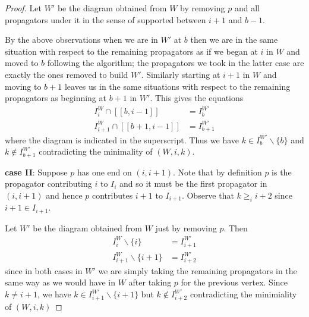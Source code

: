 \documentclass[11pt]{article}
\newcommand{\interval}[2]{[\![#1,#2]\!]}
\theoremstyle{remark}
\theoremstyle{definition}
\begin{document}
\begin{proof}
Let $W'$ be the diagram obtained from $W$ by removing $p$ and all propagators under it in the sense of supported between $i+1$ and $b-1$.

By the above observations when we are in $W'$ at $b$ then we are in the same situation with respect to the remaining propagators as if we began at $i$ in $W$ and moved to $b$ following the algorithm; the propagators we took in the latter case are exactly the ones removed to build $W'$.  Similarly starting at $i+1$ in $W$ and moving to $b+1$ leaves us in the same situations with respect to the remaining propagators as beginning at $b+1$ in $W'$.  This gives the equations
\begin{align*}
  I_i^W \cap \interval{b}{i-1} & = I_b^{W'} \\
  I_{i+1}^W \cap \interval{b+1}{i-1} & = I_{b+1}^{W'}
\end{align*}
where the diagram is indicated in the superscript.
Thus we have $k\in I_b^{W'}\backslash\{b\}$ and $k\not\in I_{b+1}^{W'}$ contradicting the minimality of $(W, i, k)$.

\textbf{case II}: Suppose $p$ has one end on $(i, i+1)$.  Note that by definition $p$ is the propagator contributing $i$ to $I_i$ and so it must be the first propagator in $(i, i+1)$ and hence $p$ contributes $i+1$ to $I_{i+1}$.  Observe that $k\geq_i i+2$ since $i+1\in I_{i+1}$.

Let $W'$ be the diagram obtained from $W$ just by removing $p$.  Then
\begin{align*}
  I_i^W \backslash \{i\} & = I_{i+1}^{W'} \\
  I_{i+1}^W \backslash \{i+1\} & = I_{i+2}^{W'}
\end{align*}
since in both cases in $W'$ we are simply taking the remaining propagators in the same way as we would have in $W$ after taking $p$ for the previous vertex.  Since $k \neq i+1$, we have $k\in I_{i+1}^{W'}\backslash\{i+1\}$ but $k\not\in I_{i+2}^{W'}$ contradicting the minimiality of $(W, i, k)$


\end{proof}
\end{document}
